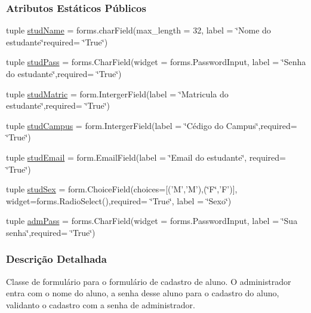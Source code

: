 \subsubsection*{Atributos Estáticos Públicos}
\begin{DoxyCompactItemize}
\item 
tuple \hyperlink{classAdm_1_1forms_1_1AdmRegStuForm_a148f5094b9746641dc5787e2d2f9b442}{stud\-Name} = forms.\-char\-Field(max\-\_\-length = 32, label = \char`\"{}Nome do estudante\char`\"{}required= \char`\"{}True\char`\"{})
\item 
tuple \hyperlink{classAdm_1_1forms_1_1AdmRegStuForm_a64f5a91780fe16298e824629a7315327}{stud\-Pass} = forms.\-Char\-Field(widget = forms.\-Password\-Input, label = \char`\"{}Senha do estudante\char`\"{},required= \char`\"{}True\char`\"{})
\item 
tuple \hyperlink{classAdm_1_1forms_1_1AdmRegStuForm_a3952916b9a15da1d6f5aef0fe70ca37a}{stud\-Matric} = form.\-Interger\-Field(label = \char`\"{}Matricula do estudante\char`\"{},required= \char`\"{}True\char`\"{})
\item 
tuple \hyperlink{classAdm_1_1forms_1_1AdmRegStuForm_ad626ad8ba2b3609252db029fba8112c1}{stud\-Campus} = form.\-Interger\-Field(label = \char`\"{}Cédigo do Campus\char`\"{},required= \char`\"{}True\char`\"{})
\item 
tuple \hyperlink{classAdm_1_1forms_1_1AdmRegStuForm_a7bb9d477582961bb017d459d7beb2a48}{stud\-Email} = form.\-Email\-Field(label = \char`\"{}Email do estudante\char`\"{}, required= \char`\"{}True\char`\"{})
\item 
tuple \hyperlink{classAdm_1_1forms_1_1AdmRegStuForm_a3a4118b48fa8d77ceb006cd7da92cfd6}{stud\-Sex} = form.\-Choice\-Field(choices=\mbox{[}('M','M'),(\char`\"{}F\char`\"{},'F')\mbox{]}, widget=forms.\-Radio\-Select(),required= \char`\"{}True\char`\"{}, label = \char`\"{}Sexo\char`\"{})
\item 
tuple \hyperlink{classAdm_1_1forms_1_1AdmRegStuForm_aa2463e5a3bdc53561cf1a1212099b8ca}{adm\-Pass} = forms.\-Char\-Field(widget = forms.\-Password\-Input, label = \char`\"{}Sua senha\char`\"{},required= \char`\"{}True\char`\"{})
\end{DoxyCompactItemize}


\subsubsection{Descrição Detalhada}
Classe de formulário para o formulário de cadastro de aluno. O administrador entra com o nome do aluno, a senha desse aluno para o cadastro do aluno, validanto o cadastro com a senha de administrador. 


